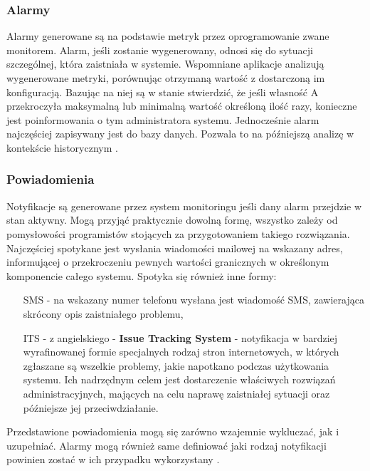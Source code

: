         \subsubsection{Alarmy}
        Alarmy generowane są na podstawie metryk przez oprogramowanie zwane monitorem. Alarm, jeśli zostanie wygenerowany, 
        odnosi się do sytuacji szczególnej, która zaistniała w systemie. Wspomniane aplikacje analizują wygenerowane metryki, 
        porównując otrzymaną wartość z dostarczoną im konfiguracją. Bazując na niej są w stanie stwierdzić, że jeśli
        własność A przekroczyła maksymalną lub minimalną wartość określoną ilość razy, konieczne jest poinformowania o tym
        administratora systemu. Jednocześnie alarm najczęściej zapisywany jest do bazy danych. Pozwala to na późniejszą 
        analizę w kontekście historycznym \cite{monitoring_and_alerting}. 
        
        \subsubsection{Powiadomienia}
        Notyfikacje są generowane przez system monitoringu jeśli dany alarm przejdzie w stan aktywny. Mogą przyjąć praktycznie
        dowolną formę, wszystko zależy od pomysłowości programistów stojących za przygotowaniem takiego rozwiązania.
        Najczęściej spotykane jest wysłania wiadomości mailowej na wskazany adres, informującej o 
        przekroczeniu pewnych wartości granicznych w określonym komponencie całego systemu. Spotyka się również inne formy:
        \begin{itemize}
            \item[SMS] - na wskazany numer telefonu wysłana jest wiadomość SMS, zawierająca skrócony opis zaistniałego 
            problemu,
            \item[ITS] - z angielskiego - \textbf{Issue Tracking System} - notyfikacja w bardziej wyrafinowanej formie 
            specjalnych rodzaj stron internetowych, w których zgłaszane są wszelkie problemy, jakie napotkano
            podczas użytkowania systemu. Ich nadrzędnym celem jest dostarczenie właściwych rozwiązań administracyjnych, 
            mających na celu naprawę zaistniałej sytuacji oraz późniejsze jej przeciwdziałanie.
        \end{itemize}
        Przedstawione powiadomienia mogą się zarówno wzajemnie wykluczać, jak i uzupełniać. Alarmy mogą również same 
        definiować jaki rodzaj notyfikacji powinien zostać w ich przypadku wykorzystany \cite{monitoring_and_alerting}.
        
